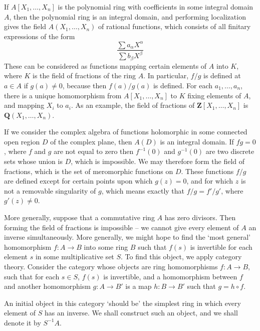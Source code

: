 \begin{example}
    If $A[X_1, \dots, X_n]$ is the polynomial ring with coefficients in some integral domain $A$, then the polynomial ring is an integral domain, and performing localization gives the field $A(X_1, \dots, X_n)$ of rational functions, which consists of all finitary expressions of the form
    \[ \frac{\sum a_\alpha X^\alpha}{\sum b_\beta X^\beta} \]
    These can be considered as functions mapping certain elements of $A$ into $K$, where $K$ is the field of fractions of the ring $A$. In particular, $f/g$ is defined at $a \in A$ if $g(a) \neq 0$, because then $f(a)/g(a)$ is defined. For each $a_1, \dots, a_n$, there is a unique homomorphism from $A[X_1, \dots, X_n]$ to $K$ fixing elements of $A$, and mapping $X_i$ to $a_i$. As an example, the field of fractions of $\mathbf{Z}[X_1, \dots, X_n]$ is $\mathbf{Q}(X_1, \dots, X_n)$.
\end{example}

\begin{example}
    If we consider the complex algebra of functions holomorphic in some connected open region $D$ of the complex plane, then $A(D)$ is an integral domain. If $fg = 0$, where $f$ and $g$ are not equal to zero then $f^{-1}(0)$ and $g^{-1}(0)$ are two discrete sets whose union is $D$, which is impossible. We may therefore form the field of fractions, which is the set of meromorphic functions on $D$. These functions $f/g$ are defined except for certain points upon which $g(z) = 0$, and for which $z$ is not a removable singularity of $g$, which means exactly that $f/g = f'/g'$, where $g'(z) \neq 0$.
\end{example}

More generally, suppose that a commutative ring $A$ has zero divisors. Then forming the field of fractions is impossible -- we cannot give every element of $A$ an inverse simultaneously. More generally, we might hope to find the `most general' homomorphism $f: A \to B$ into some ring $B$ such that $f(s)$ is invertible for each element $s$ in some multiplicative set $S$. To find this object, we apply category theory. Consider the category whose objects are ring homomorphisms $f: A \to B$, such that for each $s \in S$, $f(s)$ is invertible, and a homomorphism between $f$ and another homomorphism $g: A \to B'$ is a map $h: B \to B'$ such that $g = h \circ f$.
%
\begin{center}
\end{center}
%
An initial object in this category `should be' the simplest ring in which every element of $S$ has an inverse. We shall construct such an object, and we shall denote it by $S^{-1}A$.

